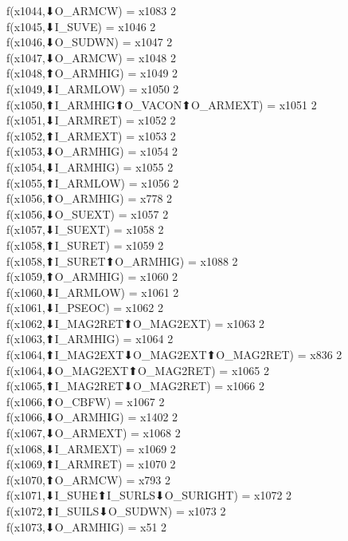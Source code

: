 f(x1044,⬇O_ARMCW) = x1083 {2} \\
f(x1045,⬇I_SUVE) = x1046 {2} \\
f(x1046,⬇O_SUDWN) = x1047 {2} \\
f(x1047,⬇O_ARMCW) = x1048 {2} \\
f(x1048,⬆O_ARMHIG) = x1049 {2} \\
f(x1049,⬇I_ARMLOW) = x1050 {2} \\
f(x1050,⬆I_ARMHIG⬆O_VACON⬆O_ARMEXT) = x1051 {2} \\
f(x1051,⬇I_ARMRET) = x1052 {2} \\
f(x1052,⬆I_ARMEXT) = x1053 {2} \\
f(x1053,⬇O_ARMHIG) = x1054 {2} \\
f(x1054,⬇I_ARMHIG) = x1055 {2} \\
f(x1055,⬆I_ARMLOW) = x1056 {2} \\
f(x1056,⬆O_ARMHIG) = x778 {2} \\
f(x1056,⬇O_SUEXT) = x1057 {2} \\
f(x1057,⬇I_SUEXT) = x1058 {2} \\
f(x1058,⬆I_SURET) = x1059 {2} \\
f(x1058,⬆I_SURET⬆O_ARMHIG) = x1088 {2} \\
f(x1059,⬆O_ARMHIG) = x1060 {2} \\
f(x1060,⬇I_ARMLOW) = x1061 {2} \\
f(x1061,⬇I_PSEOC) = x1062 {2} \\
f(x1062,⬇I_MAG2RET⬆O_MAG2EXT) = x1063 {2} \\
f(x1063,⬆I_ARMHIG) = x1064 {2} \\
f(x1064,⬆I_MAG2EXT⬇O_MAG2EXT⬆O_MAG2RET) = x836 {2} \\
f(x1064,⬇O_MAG2EXT⬆O_MAG2RET) = x1065 {2} \\
f(x1065,⬆I_MAG2RET⬇O_MAG2RET) = x1066 {2} \\
f(x1066,⬆O_CBFW) = x1067 {2} \\
f(x1066,⬇O_ARMHIG) = x1402 {2} \\
f(x1067,⬇O_ARMEXT) = x1068 {2} \\
f(x1068,⬇I_ARMEXT) = x1069 {2} \\
f(x1069,⬆I_ARMRET) = x1070 {2} \\
f(x1070,⬆O_ARMCW) = x793 {2} \\
f(x1071,⬇I_SUHE⬆I_SURLS⬇O_SURIGHT) = x1072 {2} \\
f(x1072,⬆I_SUILS⬇O_SUDWN) = x1073 {2} \\
f(x1073,⬇O_ARMHIG) = x51 {2} \\
